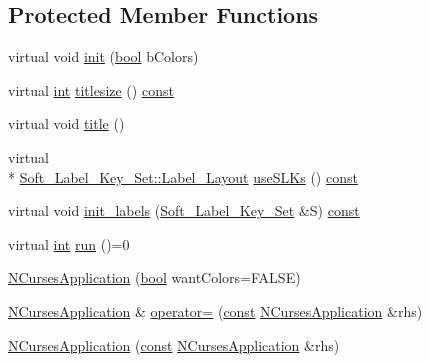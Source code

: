 \subsection*{Protected Member Functions}
\begin{DoxyCompactItemize}
\item 
virtual void \hyperlink{class_n_curses_application_af5a64740722485562ab3063fac8e5589}{init} (\hyperlink{term__entry_8h_a002004ba5d663f149f6c38064926abac}{bool} b\-Colors)
\item 
virtual \hyperlink{term__entry_8h_ad65b480f8c8270356b45a9890f6499ae}{int} \hyperlink{class_n_curses_application_a904000c73395b026846bdc0f683fee2a}{titlesize} () \hyperlink{term__entry_8h_a57bd63ce7f9a353488880e3de6692d5a}{const} 
\item 
virtual void \hyperlink{class_n_curses_application_af6a34b8fb44856a8d5d322d6f1ddf9e4}{title} ()
\item 
virtual \\*
\hyperlink{class_soft___label___key___set_a4d68b5593db1c9c763e3916b2b6edaf6}{Soft\-\_\-\-Label\-\_\-\-Key\-\_\-\-Set\-::\-Label\-\_\-\-Layout} \hyperlink{class_n_curses_application_a722d8c69d964df81bed8643b88f8fab4}{use\-S\-L\-Ks} () \hyperlink{term__entry_8h_a57bd63ce7f9a353488880e3de6692d5a}{const} 
\item 
virtual void \hyperlink{class_n_curses_application_a5747bac8974ab593ae8e2f69d9389ea2}{init\-\_\-labels} (\hyperlink{class_soft___label___key___set}{Soft\-\_\-\-Label\-\_\-\-Key\-\_\-\-Set} \&S) \hyperlink{term__entry_8h_a57bd63ce7f9a353488880e3de6692d5a}{const} 
\item 
virtual \hyperlink{term__entry_8h_ad65b480f8c8270356b45a9890f6499ae}{int} \hyperlink{class_n_curses_application_ac0b3a68c94540b85dba1e39003abb115}{run} ()=0
\item 
\hyperlink{class_n_curses_application_a65ac14567741eadf143dc453e303f150}{N\-Curses\-Application} (\hyperlink{term__entry_8h_a002004ba5d663f149f6c38064926abac}{bool} want\-Colors=F\-A\-L\-S\-E)
\item 
\hyperlink{class_n_curses_application}{N\-Curses\-Application} \& \hyperlink{class_n_curses_application_ac5effc2f818d5daf12cd37965e830bac}{operator=} (\hyperlink{term__entry_8h_a57bd63ce7f9a353488880e3de6692d5a}{const} \hyperlink{class_n_curses_application}{N\-Curses\-Application} \&rhs)
\item 
\hyperlink{class_n_curses_application_aa45919b98b7103ae735bf7ee080b6dfa}{N\-Curses\-Application} (\hyperlink{term__entry_8h_a57bd63ce7f9a353488880e3de6692d5a}{const} \hyperlink{class_n_curses_application}{N\-Curses\-Application} \&rhs)
\end{DoxyCompactItemize}
